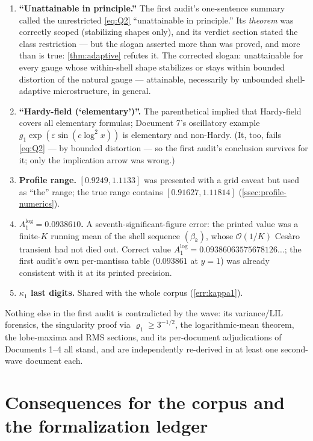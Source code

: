 \documentclass[11pt,oneside]{article}
\theoremstyle{definition}
\theoremstyle{remark}
\newcommand{\bigO}{\mathcal O}
\begin{document}
\begin{enumerate}
\item \textbf{``Unattainable in principle.''}  The first audit's
one-sentence summary called the unrestricted \eqref{eq:Q2}
``unattainable in principle.''  Its \emph{theorem} was correctly scoped
(stabilizing shapes only), and its verdict section stated the class
restriction --- but the slogan asserted more than was proved, and more
than is true: \cref{thm:adaptive} refutes it.  The corrected slogan:
unattainable for every gauge whose within-shell shape stabilizes or
stays within bounded distortion of the natural gauge --- attainable,
necessarily by unbounded shell-adaptive microstructure, in general.
\item \textbf{``Hardy-field (`elementary')''.}  The parenthetical
implied that Hardy-field covers all elementary formulas; Document 7's
oscillatory example $g_1\exp(\varepsilon\sin(c\log^2x))$ is elementary
and non-Hardy.  (It, too, fails \eqref{eq:Q2} --- by bounded
distortion --- so the first audit's conclusion survives for it; only
the implication arrow was wrong.)
\item \textbf{Profile range.}  $[0.9249,1.1133]$ was presented with a
grid caveat but used as ``the'' range; the true range contains
$[0.91627,1.11814]$ (\cref{ssec:profile-numerics}).
\item \textbf{$A_1^{\log}=0.0938610$.}  A seventh-significant-figure
error: the printed value was a finite-$K$ running mean of the shell
sequence $(\beta_k)$, whose $\bigO(1/K)$ Ces\`aro transient had not
died out.  Correct value $A_1^{\log}=0.09386063575678126\ldots$; the
first audit's own per-mantissa table ($0.093861$ at $y=1$) was already
consistent with it at its printed precision.
\item \textbf{$\kappa_1$ last digits.}  Shared with the whole corpus
(\cref{err:kappa1}).
\end{enumerate}

Nothing else in the first audit is contradicted by the wave: its
variance/LIL forensics, the singularity proof via
$\varrho_1\ge3^{-1/2}$, the logarithmic-mean theorem, the lobe-maxima
and RMS sections, and its per-document adjudications of Documents 1--4
all stand, and are independently re-derived in at least one second-wave
document each.

\section{Consequences for the corpus and the formalization ledger}
\label{sec:lean}
\end{document}
